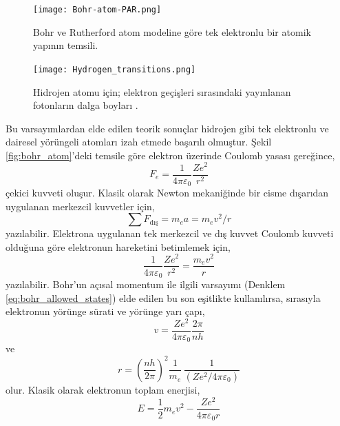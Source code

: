 \documentclass[a4paper,12pt, twoside]{article}
\begin{document}
\begin{figure}[hbtp]
\center
\begin{minipage}{.48\textwidth}
\center
\texttt{[image: Bohr-atom-PAR.png]}
\caption{Bohr ve Rutherford atom modeline göre tek elektronlu bir atomik yapının temsili.}
\label{fig:bohr_atom}
\end{minipage}
\hspace{12pt}
\begin{minipage}{.48\textwidth}
\center
\texttt{[image: Hydrogen\_transitions.png]}
\caption{Hidrojen atomu için; elektron geçişleri sırasındaki yayınlanan fotonların dalga boyları \cite{web:wiki_Hydrogen_spectral_series}.}
\label{fig:hydrogen_transitions}
\end{minipage}
\end{figure}


Bu varsayımlardan elde edilen teorik sonuçlar hidrojen gibi tek elektronlu ve dairesel yörüngeli atomları izah etmede başarılı olmuştur. Şekil \ref{fig:bohr_atom}'deki temsile göre elektron üzerinde Coulomb yasası gereğince,
\begin{equation}
F_e = \frac{1}{4\pi\varepsilon_0} \frac{Ze^2}{r^2}
\label{eq:bohr_elektron}
\end{equation}
çekici kuvveti oluşur. Klasik olarak Newton mekaniğinde bir cisme dışarıdan uygulanan merkezcil kuvvetler için,
\begin{equation}
\sum F_\text{dış} = m_e a = m_e v^2/r
\label{eq:newton_ma}
\end{equation}
yazılabilir. Elektrona uygulanan tek merkezcil ve dış kuvvet Coulomb kuvveti olduğuna göre elektronun hareketini betimlemek için,
\begin{equation}
\frac{1}{4\pi\varepsilon_0} \frac{Ze^2}{r^2} = \frac{m_e v^2}{r} 
\label{eq:bohr_orbit_motion}
\end{equation}
yazılabilir. Bohr'un açısal momentum ile ilgili varsayımı (Denklem \ref{eq:bohr_allowed_states}) elde edilen bu son eşitlikte kullanılırsa, sırasıyla elektronun yörünge sürati ve yörünge yarı çapı,
\begin{equation}
v = \frac{Ze^2}{4\pi\varepsilon_0}  \frac{2\pi}{n h}
\label{eq:bohr_elektron_speed}
\end{equation}
ve
\begin{equation}
r = \left(\frac{n h}{2 \pi} \right)^2 \frac{1}{m_e}\, \frac{1}{(Z e^2/4\pi\varepsilon_0)}
\label{eq:bohr_elektron_radius}
\end{equation}
olur. Klasik olarak elektronun toplam enerjisi,
\begin{equation}
E = \frac{1}{2}m_e v^2 - \frac{Z e^2}{4\pi\varepsilon_0 r}
\label{eq:bohr_elektron_energy1}
\end{equation}
\end{document}
